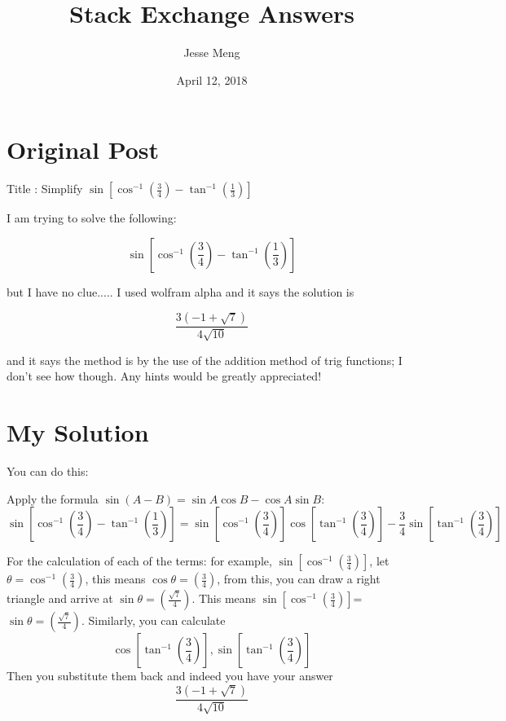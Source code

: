 \documentclass{article}
\title{Stack Exchange Answers}
\author{Jesse Meng }
\date{April 12, 2018}
\begin{document}
\maketitle

\section{Original Post}
Title : Simplify $\sin[\cos^{-1}(\frac{3}{4}) - \tan^{-1}(\frac{1}{3})]$

I am trying to solve the following:

$$\sin\left[\cos^{-1}\left(\frac{3}{4}\right) - \tan^{-1}\left(\frac{1}{3}\right)\right]$$

but I have no clue.....  I used wolfram alpha and it says the solution is 

$$\frac{3(-1+\sqrt{7})}{4\sqrt{10}}$$

and it says the method is by the use of the addition method of trig functions; I don't see how though.  Any hints would be greatly appreciated!
\section{My Solution}
You can do this:

Apply the formula $\sin(A-B)=\sin A \cos B-\cos A \sin B$:
$$\sin\left[\cos^{-1}\left(\frac{3}{4}\right) - \tan^{-1}\left(\frac{1}{3}\right)\right]=\sin\left[\cos^{-1}\left(\frac{3}{4}\right)\right]\cos\left[\tan^{-1}\left(\frac{3}{4}\right)\right]-\frac{3}{4}\sin\left[\tan^{-1}\left(\frac{3}{4}\right)\right]$$ 

For the calculation of each of the terms: 
for example, $\sin\left[\cos^{-1}\left(\frac{3}{4}\right)\right]$, let $\theta=\cos^{-1}\left(\frac{3}{4}\right)$, this means $\cos\theta=\left(\frac{3}{4}\right)$, from this, you can draw a right triangle and arrive at $\sin\theta=\left(\frac{\sqrt{7}}{4}\right)$. This means $\sin\left[\cos^{-1}\left(\frac{3}{4}\right)\right]$=$\sin\theta=\left(\frac{\sqrt{7}}{4}\right)$. Similarly, you can calculate 
$$\cos\left[\tan^{-1}\left(\frac{3}{4}\right)\right],\sin\left[\tan^{-1}\left(\frac{3}{4}\right)\right]$$  Then you substitute them back and indeed you have your answer
$$\frac{3(-1+\sqrt{7})}{4\sqrt{10}}$$
\end{document}
